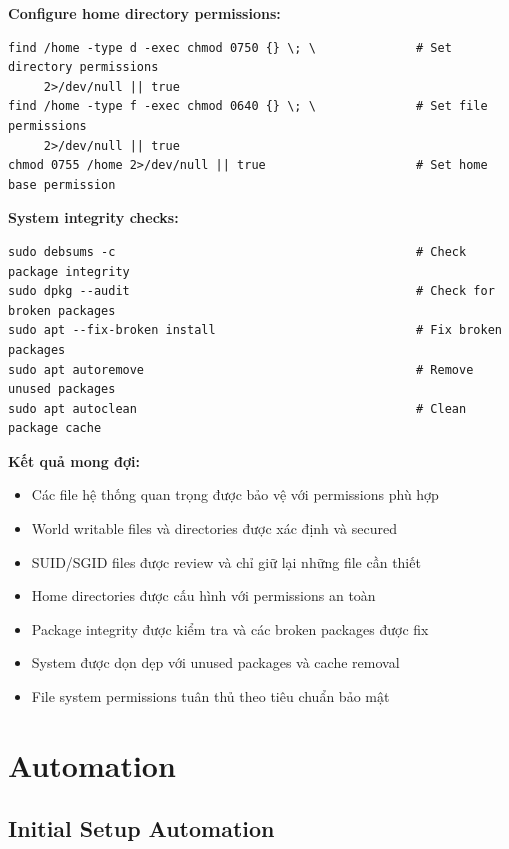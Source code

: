 \noindent \textbf{Configure home directory permissions:}
\begin{verbatim}
find /home -type d -exec chmod 0750 {} \; \              # Set directory permissions
     2>/dev/null || true
find /home -type f -exec chmod 0640 {} \; \              # Set file permissions
     2>/dev/null || true
chmod 0755 /home 2>/dev/null || true                     # Set home base permission
\end{verbatim}

\noindent \textbf{System integrity checks:}
\begin{verbatim}
sudo debsums -c                                          # Check package integrity
sudo dpkg --audit                                        # Check for broken packages
sudo apt --fix-broken install                            # Fix broken packages
sudo apt autoremove                                      # Remove unused packages
sudo apt autoclean                                       # Clean package cache
\end{verbatim}

\noindent \textbf{Kết quả mong đợi:}
\begin{itemize}
\item Các file hệ thống quan trọng được bảo vệ với permissions phù hợp
\item World writable files và directories được xác định và secured
\item SUID/SGID files được review và chỉ giữ lại những file cần thiết
\item Home directories được cấu hình với permissions an toàn
\item Package integrity được kiểm tra và các broken packages được fix
\item System được dọn dẹp với unused packages và cache removal
\item File system permissions tuân thủ theo tiêu chuẩn bảo mật
\end{itemize}

\section{Automation}

\subsection{Initial Setup Automation}


